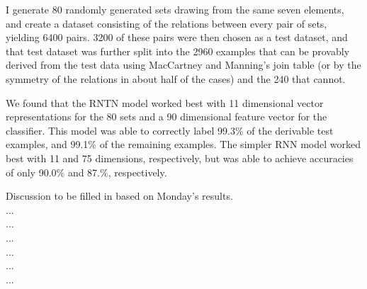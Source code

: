 I generate 80 randomly generated sets drawing from the same seven elements, and create a dataset consisting of the relations between every pair of sets, yielding 6400 pairs. 3200 of these pairs were then chosen as a test dataset, and that test dataset was further split into the 2960 examples that can be provably derived from the test data using MacCartney and Manning's join table (or by the symmetry of the relations in about half of the cases) and the 240 that cannot. %

We found that the RNTN model worked best with 11 dimensional vector representations for the 80 sets and a 90 dimensional feature vector for the classifier. This model was able to correctly label 99.3\% of the derivable test examples, and 99.1\% of the remaining examples. The simpler RNN model worked best with 11 and 75 dimensions, respectively, but was able to achieve accuracies of only 90.0\% and 87.\%, respectively.


Discussion to be filled in based on Monday's results.\\...\\...\\...\\...\\...\\...

